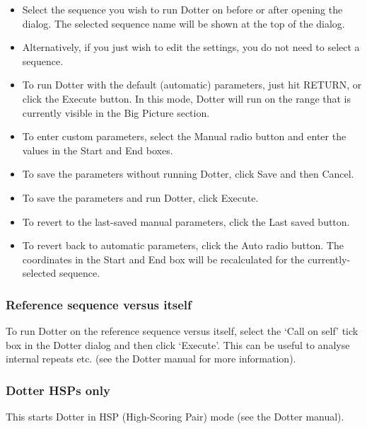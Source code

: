 \documentclass[letterpaper]{article}
\newcommand\liststyleWWviiiNumxxxvii{%
\renewcommand\labelitemi{{\textbullet}}
\renewcommand\labelitemii{o}
\renewcommand\labelitemiii{[F0A7?]}
\renewcommand\labelitemiv{[F0B7?]}
}
\begin{document}
\liststyleWWviiiNumxxxvii
\begin{itemize}
\item {Select the sequence you wish to run Dotter on before or after opening the dialog. The selected sequence name will be shown at the top of the dialog.}
\item {Alternatively, if you just wish to edit the settings, you do not need to select a sequence.}
\item {To run Dotter with the default (automatic) parameters, just hit RETURN, or click the {\textquotesingle}Execute{\textquotesingle} button. In this mode, Dotter will run on the range that is currently visible in the Big Picture section.}
\item {To enter custom parameters, select the {\textquotesingle}Manual{\textquotesingle} radio button and enter the values in the {\textquotesingle}Start{\textquotesingle} and {\textquotesingle}End{\textquotesingle} boxes.}
\item {To save the parameters without running Dotter, click Save and then Cancel{\textquotesingle}.}
\item {To save the parameters and run Dotter, click {\textquotesingle}Execute{\textquotesingle}.}
\item {To revert to the last-saved manual parameters, click the {\textquotesingle}Last saved{\textquotesingle} button.}
\item {To revert back to automatic parameters, click the {\textquotesingle}Auto{\textquotesingle} radio button. The coordinates in the Start and End box will be recalculated for the currently-selected sequence.}
\end{itemize}
{\color[rgb]{0.30980393,0.5058824,0.7411765}\subsubsection[Reference sequence versus itself]{Reference sequence versus itself}}
\hypertarget{RefHeading2181056909880}{}
To run Dotter on the reference sequence versus itself, select the {\textquoteleft}Call on self{\textquoteright} tick box in the Dotter dialog and then click {\textquoteleft}Execute{\textquoteright}. This can be useful to analyse internal repeats etc. (see the Dotter manual for more information).

\bigskip

{\color[rgb]{0.30980393,0.5058824,0.7411765}\subsubsection[Dotter HSPs only]{Dotter HSPs only}}
\hypertarget{RefHeading2201056909880}{}{
This starts Dotter in HSP (High-Scoring Pair) mode (see the Dotter
manual).}
\end{document}
